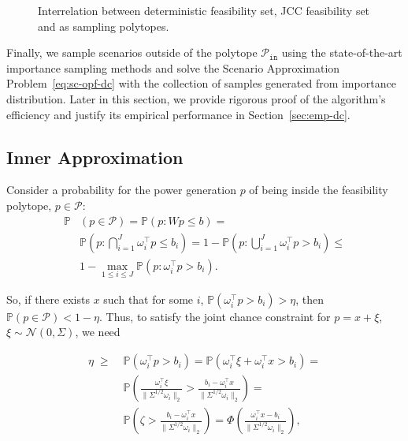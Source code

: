 \begin{figure}

\caption{Interrelation between deterministic feasibility set, JCC feasibility set and as sampling polytopes.}
  \label{fig:10-dc}
\end{figure}

Finally, we sample scenarios outside of the polytope $\mathcal{P}_{\texttt{in}}$ using the state-of-the-art importance sampling methods \cite{owen2019importance,lukashevich2021power} and solve the Scenario Approximation Problem~\eqref{eq:sc-opf-dc} with the collection of samples generated from importance distribution. Later in this section, we provide rigorous proof of the algorithm's efficiency and justify its empirical performance in Section~\ref{sec:emp-dc}. 

\subsection{Inner Approximation}

Consider a probability for the power generation $p$ of being inside the feasibility polytope, $p\in \mathcal{P}$:
\begin{align*}
  \mathbb{P}&(p\in \mathcal{P}) = 
  \mathbb{P}(p: Wp \le b) = \\
  & \mathbb{P}\left(p: \bigcap_{i=1}^J \omega_i^\top p \le b_i\right) = 1 - \mathbb{P}\left(p: \bigcup_{i=1}^J \omega_i^\top p > b_i\right)\le\\
  & 1 - \max_{1\le i\le J}\mathbb{P}\left(p: \omega_i^\top p > b_i\right).
\end{align*}

So, if there exists $x$ such that for some $i$, $\mathbb{P}(\omega_i^\top p > b_i) > \eta$, then $\mathbb{P}(p\in \mathcal{P}) < 1-\eta$. Thus, to satisfy the joint chance constraint for $p = x+\xi$, $\xi\sim \mathcal{N}(0, \Sigma)$, we need

\begin{align}
  \eta \;\ge\; & \mathbb{P}(\omega_i^\top p > b_i) = \mathbb{P}(\omega_i^\top \xi + \omega_i^\top x > b_i) = \nonumber\\
  & 
  \mathbb{P}\left(\frac{\omega_i^\top \xi}{\|\Sigma^{1/2}\omega_i\|_2} > \frac{b_i - \omega_i^\top x}{\|\Sigma^{1/2}\omega_i\|_2}\right) = \nonumber\\
  & \mathbb{P}\left(\zeta > \frac{b_i - \omega_i^\top x}{\|\Sigma^{1/2}\omega_i\|_2}\right) = \Phi\left(\frac{\omega_i^\top x - b_i}{\|\Sigma^{1/2}\omega_i\|_2}\right), \label{eq:cnv-dc}
\end{align}

